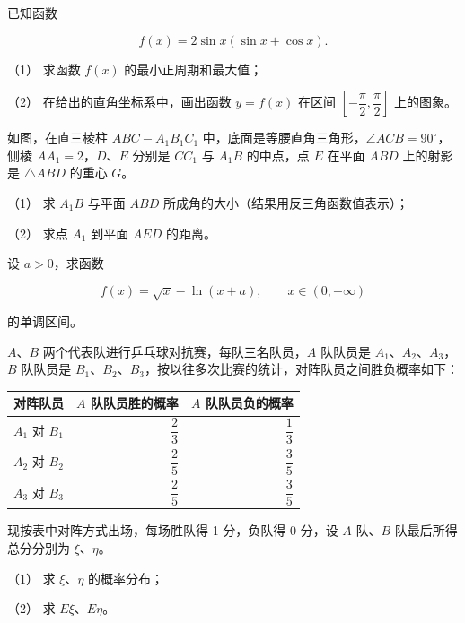 \Needspace{0.4\textheight}
\begin{question}
已知函数

\nopagebreak[4]
\[
f(x)=2\sin x(\sin x+\cos x).
\]

（1） 求函数 $f(x)$ 的最小正周期和最大值；

（2） 在给出的直角坐标系中，画出函数 $y=f(x)$ 在区间 $\left[-\dfrac\pi2,\dfrac\pi2\right]$ 上的图象。
\nopagebreak[4]
\begin{center}\end{center}
\nopagebreak[4]
\Needspace{0.4\textheight}
\end{question}
\begin{question}
如图，在直三棱柱 $ABC-A_1B_1C_1$ 中，底面是等腰直角三角形，$\angle ACB=90^\circ$，侧棱 $AA_1=2$，$D\text{、}E$ 分别是 $CC_1$ 与 $A_1B$ 的中点，点 $E$ 在平面 $ABD$ 上的射影是 $\triangle ABD$ 的重心 $G$。
\nopagebreak[4]
\begin{center}\end{center}
\nopagebreak[4]
（1） 求 $A_1B$ 与平面 $ABD$ 所成角的大小（结果用反三角函数值表示）；

（2） 求点 $A_1$ 到平面 $AED$ 的距离。

\end{question}
\begin{question}
设 $a>0$，求函数

\nopagebreak[4]
\[
f(x)=\sqrt{x}-\ln(x+a),\qquad x\in(0,+\infty)
\]

的单调区间。

\end{question}
\begin{question}
$A\text{、}B$ 两个代表队进行乒乓球对抗赛，每队三名队员，$A$ 队队员是 $A_1\text{、}A_2\text{、}A_3$，$B$ 队队员是 $B_1\text{、}B_2\text{、}B_3$，按以往多次比赛的统计，对阵队员之间胜负概率如下：

\begin{center}
\begin{tabular}{lrr}
\toprule
对阵队员 & $A$ 队队员胜的概率 & $A$ 队队员负的概率 \\
\midrule
$A_1$ 对 $B_1$ & $\dfrac23$ & $\dfrac13$ \\
$A_2$ 对 $B_2$ & $\dfrac25$ & $\dfrac35$ \\
$A_3$ 对 $B_3$ & $\dfrac25$ & $\dfrac35$ \\
\bottomrule
\end{tabular}
\end{center}

现按表中对阵方式出场，每场胜队得 1 分，负队得 0 分，设 $A$ 队、$B$ 队最后所得总分分别为 $\xi\text{、}\eta$。

（1） 求 $\xi\text{、}\eta$ 的概率分布；

（2） 求 $E\xi\text{、}E\eta$。

\end{question}
